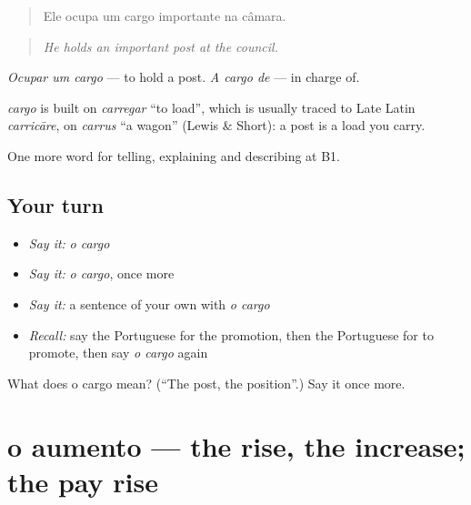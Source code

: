 \begin{quote}
Ele ocupa um cargo importante na câmara.
\end{quote}

\begin{quote}
\emph{He holds an important post at the council.}
\end{quote}

\emph{Ocupar um cargo} — to hold a post. \emph{A cargo de} — in charge of.

\begin{cousinweb}
\emph{cargo} is built on \emph{carregar} \textquotedblleft{}to load\textquotedblright{}, which is usually traced to Late Latin \emph{carricāre}, on \emph{carrus} \textquotedblleft{}a wagon\textquotedblright{} (Lewis \& Short): a post is a load you carry.
\end{cousinweb}

\begin{grammarlens}[title={What you've built}]
One more word for telling, explaining and describing at B1.
\end{grammarlens}

\subsection*{Your turn}
\begin{itemize}
\raggedright
  \item \emph{Say it:} \emph{o cargo}
  \item \emph{Say it:} \emph{o cargo}, once more
  \item \emph{Say it:} a sentence of your own with \emph{o cargo}
  \item \emph{Recall:} say the Portuguese for the promotion, then the Portuguese for to promote, then say \emph{o cargo} again
\end{itemize}

\begin{tcolorbox}[breakable,colback=teal!4,colframe=teal!35!black,title={Before you move on}]
What does o cargo mean? (\textquotedblleft{}The post, the position\textquotedblright{}.) Say it once more.
\end{tcolorbox}
\section[o aumento]{o aumento — the rise, the increase; the pay rise}

\label{lesson:PT-C360-aumento}



